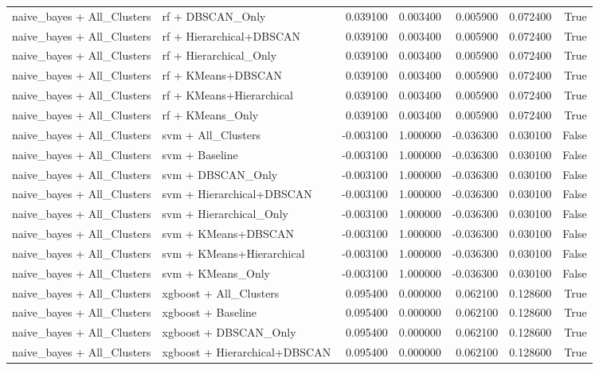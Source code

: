 \begin{tabular}{llrrrrr}
naive_bayes + All_Clusters & rf + DBSCAN_Only & 0.039100 & 0.003400 & 0.005900 & 0.072400 & True \\
naive_bayes + All_Clusters & rf + Hierarchical+DBSCAN & 0.039100 & 0.003400 & 0.005900 & 0.072400 & True \\
naive_bayes + All_Clusters & rf + Hierarchical_Only & 0.039100 & 0.003400 & 0.005900 & 0.072400 & True \\
naive_bayes + All_Clusters & rf + KMeans+DBSCAN & 0.039100 & 0.003400 & 0.005900 & 0.072400 & True \\
naive_bayes + All_Clusters & rf + KMeans+Hierarchical & 0.039100 & 0.003400 & 0.005900 & 0.072400 & True \\
naive_bayes + All_Clusters & rf + KMeans_Only & 0.039100 & 0.003400 & 0.005900 & 0.072400 & True \\
naive_bayes + All_Clusters & svm + All_Clusters & -0.003100 & 1.000000 & -0.036300 & 0.030100 & False \\
naive_bayes + All_Clusters & svm + Baseline & -0.003100 & 1.000000 & -0.036300 & 0.030100 & False \\
naive_bayes + All_Clusters & svm + DBSCAN_Only & -0.003100 & 1.000000 & -0.036300 & 0.030100 & False \\
naive_bayes + All_Clusters & svm + Hierarchical+DBSCAN & -0.003100 & 1.000000 & -0.036300 & 0.030100 & False \\
naive_bayes + All_Clusters & svm + Hierarchical_Only & -0.003100 & 1.000000 & -0.036300 & 0.030100 & False \\
naive_bayes + All_Clusters & svm + KMeans+DBSCAN & -0.003100 & 1.000000 & -0.036300 & 0.030100 & False \\
naive_bayes + All_Clusters & svm + KMeans+Hierarchical & -0.003100 & 1.000000 & -0.036300 & 0.030100 & False \\
naive_bayes + All_Clusters & svm + KMeans_Only & -0.003100 & 1.000000 & -0.036300 & 0.030100 & False \\
naive_bayes + All_Clusters & xgboost + All_Clusters & 0.095400 & 0.000000 & 0.062100 & 0.128600 & True \\
naive_bayes + All_Clusters & xgboost + Baseline & 0.095400 & 0.000000 & 0.062100 & 0.128600 & True \\
naive_bayes + All_Clusters & xgboost + DBSCAN_Only & 0.095400 & 0.000000 & 0.062100 & 0.128600 & True \\
naive_bayes + All_Clusters & xgboost + Hierarchical+DBSCAN & 0.095400 & 0.000000 & 0.062100 & 0.128600 & True \\

\end{tabular}
